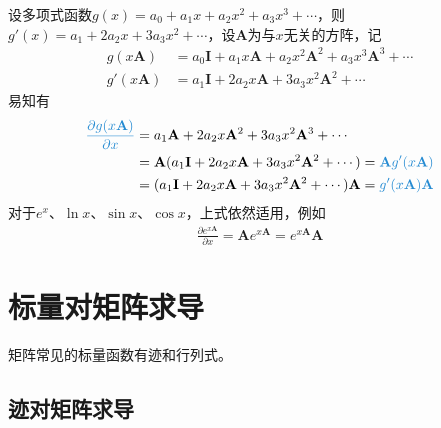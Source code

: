 \documentclass{ctexart}
\newcommand{\blue}[1]{\textcolor{Solarized-blue}{#1}}
\theoremstyle{definition}
\def \Av {\mathbf{A}}
\def \Iv {\mathbf{I}}
\begin{document}
设多项式函数$g(x) = a_0 + a_1 x + a_2 x^2 + a_3 x^3 + \cdots$，则$g'(x) = a_1 + 2 a_2 x + 3 a_3 x^2 + \cdots$，设$\Av$为与$x$无关的方阵，记
\begin{align*}
    g (x \Av)  & = a_0 \Iv + a_1 x \Av + a_2 x^2 \Av^2 + a_3 x^3 \Av^3 + \cdots \\
    g' (x \Av) & = a_1 \Iv + 2 a_2 x \Av + 3 a_3 x^2 \Av^2 + \cdots
\end{align*}
易知有
\begin{align*}
    \blue{\frac{\partial g(x \Av)}{\partial x}} & = a_1 \Av + 2 a_2 x \Av^2 + 3 a_3 x^2 \Av^3 + \cdots                             \\
                                                & = \Av (a_1 \Iv + 2 a_2 x \Av + 3 a_3 x^2 \Av^2 + \cdots) = \blue{\Av g' (x \Av)} \\
                                                & = (a_1 \Iv + 2 a_2 x \Av + 3 a_3 x^2 \Av^2 + \cdots) \Av = \blue{g' (x \Av) \Av}
\end{align*}
对于$e^x$、$\ln x$、$\sin x$、$\cos x$，上式依然适用，例如
\begin{align*}
    \frac{\partial e^{x \Av}}{\partial x} = \Av e^{x \Av} = e^{x \Av} \Av
\end{align*}

\section{标量对矩阵求导}

矩阵常见的标量函数有\blue{迹}和\blue{行列式}。

\subsection{迹对矩阵求导}
\end{document}

